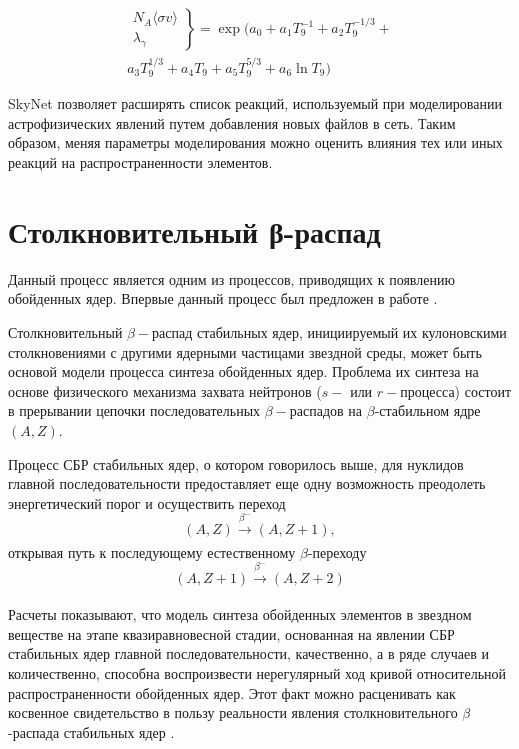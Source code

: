 \documentclass[14pt, a4paper]{article}
\numberwithin{figure}{section}
\numberwithin{equation}{section}
\begin{document}
\begin{equation}
\label{eq:system}
\begin{split}
\left.
\begin{array}{ccc}
N_{A}\langle \sigma v \rangle \\
\lambda_\gamma
\end{array}
\right\}
= \exp (a_0 + a_1 T_9^{-1} + a_2 T_9^{-1/3} + \\
a_3 T_9^{1/3} + a_4 T_9 + a_5 T_9^{5/3} + a_6 \ln T_9)
\end{split}
\end{equation}

SkyNet позволяет расширять список реакций, используемый при моделировании астрофизических явлений путем добавления новых файлов в сеть. Таким образом, меняя параметры моделирования можно оценить влияния тех или иных реакций на распространенности элементов.


\section{Столкновительный β-распад}
Данный процесс является одним из процессов, приводящих к появлению обойденных ядер. Впервые данный процесс был предложен в работе \cite{batkin}. 

Столкновительный $\beta-$распад стабильных ядер, инициируемый их кулоновскими столкновениями с другими ядерными частицами звездной среды, может быть основой модели процесса синтеза обойденных ядер.
Проблема их синтеза на основе физического механизма захвата нейтронов ($s-$ или $r-$процесса) состоит в прерывании цепочки последовательных $\beta-$распадов на $\beta$-стабильном ядре $(A,Z)$.

Процесс СБР стабильных ядер, о котором говорилось выше, для нуклидов главной последовательности предоставляет еще одну возможность преодолеть энергетический порог и осуществить переход 
$$(A,Z) \xrightarrow[]{\beta^-} (A,Z + 1),$$
открывая путь к последующему естественному $\beta$-переходу
$$(A,Z+1) \xrightarrow[]{\beta^-} (A,Z + 2)$$

Расчеты показывают, что модель синтеза обойденных элементов в звездном веществе на этапе квазиравновесной стадии, основанная на явлении СБР стабильных ядер главной последовательности, качественно, а в ряде случаев и количественно, способна воспроизвести нерегулярный ход кривой относительной распространенности обойденных ядер. Этот факт можно расценивать как косвенное свидетельство в пользу реальности явления столкновительного $\beta$-распада стабильных ядер \cite{tak}.
\end{document}
